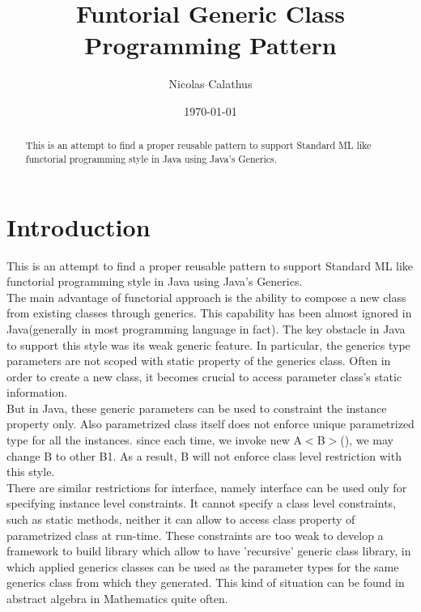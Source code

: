 \documentclass[8pt]{article}
\begin{document}
\title{Funtorial Generic Class Programming Pattern} %
\author{Nicolas Calathus} %
\date{\today}
\maketitle
\begin{abstract}
This is an attempt to find a proper reusable pattern to support Standard ML like functorial programming style in Java using Java's Generics.
\end{abstract}
\tableofcontents

\section{Introduction} %

This is an attempt to find a proper reusable pattern to support Standard ML like functorial programming style in Java using Java's Generics.\\
The main advantage of functorial approach is the ability to compose a new class from existing classes through generics.
This capability has been almost ignored in Java(generally in most programming language in fact).
The key obstacle in Java to support this style was its weak generic feature. In particular, the generics type parameters are not scoped with static property of the generics class.
Often in order to create a new class, it becomes crucial to access parameter class's static information.\\

But in Java, these generic parameters can be used to constraint the instance property only.
Also parametrized class itself does not enforce unique parametrized type for all the instances. since each time, we invoke new A$<$B$>$(), we may change B to other B1.
As a result, B will not enforce class level restriction with this style.\\

There are similar restrictions for interface, namely interface can be used only for specifying instance level constraints. 
It cannot specify a class level constraints, such as static methods, neither it can allow to access class property of parametrized class at run-time.
These constraints are too weak to develop a framework to build library which allow to have 'recursive' generic class library, in which applied generics classes can be used as the parameter types for the same generics class from which they generated.    
This kind of situation can be found in abstract algebra in Mathematics quite often.\\
\end{document}
